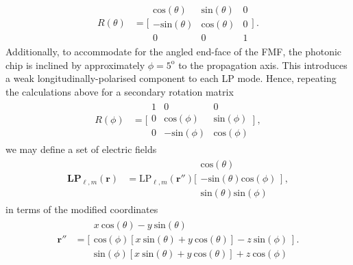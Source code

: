 \documentclass[%
 reprint,
 amsmath,amssymb,
 aps,
pra,
]{revtex4-2}
\begin{document}
\begin{align}
    R(\theta) &= \Bigg[\begin{smallmatrix}
        \mathrm{cos}\left(\theta\right) & \mathrm{sin}\left(\theta\right) & 0 \\
        -\mathrm{sin}\left(\theta\right) & \mathrm{cos}\left(\theta\right) & 0 \\
        0 & 0 & 1
    \end{smallmatrix}\Bigg] ~ .
\end{align}
Additionally, to accommodate for the angled end-face of the FMF, the photonic chip is inclined by approximately $\phi =5^{\mathrm{o}}$ to the propagation axis. This introduces a weak longitudinally-polarised component to each LP mode. Hence, repeating the calculations above for a secondary rotation matrix
\begin{align}
    R(\phi) &= \Bigg[\begin{smallmatrix}
        1 & 0 & 0 \\
        0 & \mathrm{cos}\left(\phi\right) & \mathrm{sin}\left(\phi\right) \\
        0 & -\mathrm{sin}\left(\phi\right) & \mathrm{cos}\left(\phi\right)
    \end{smallmatrix}\Bigg] ~ ,
\end{align}
we may define a set of electric fields
\begin{align}\label{LPElectricFields}
    \textbf{LP}_{\ell, m}(\boldsymbol{r}) &=  \mathrm{LP}_{\ell, m}(\boldsymbol{r}'') \Bigg[\begin{smallmatrix}
        \mathrm{cos}\left(\theta\right) \\
        -\mathrm{sin}\left(\theta\right)\mathrm{cos}\left(\phi\right) \\
        \mathrm{sin}\left(\theta\right)\mathrm{sin}\left(\phi\right)
    \end{smallmatrix}\Bigg] ~ ,
\end{align}
in terms of the modified coordinates
\begin{align}
    \boldsymbol{r}'' &= \Bigg[\begin{smallmatrix}
        x~\mathrm{cos}\left(\theta\right) - y~\mathrm{sin}\left(\theta\right) \\
        \mathrm{cos}\left(\phi\right)[x~\mathrm{sin}\left(\theta\right) + y~\mathrm{cos}\left(\theta\right)] - z~\mathrm{sin}\left(\phi\right) \\
        \mathrm{sin}\left(\phi\right)[x~\mathrm{sin}\left(\theta\right) + y~\mathrm{cos}\left(\theta\right)] + z~\mathrm{cos}\left(\phi\right)
    \end{smallmatrix}\Bigg] ~ .
\end{align}
\end{document}
